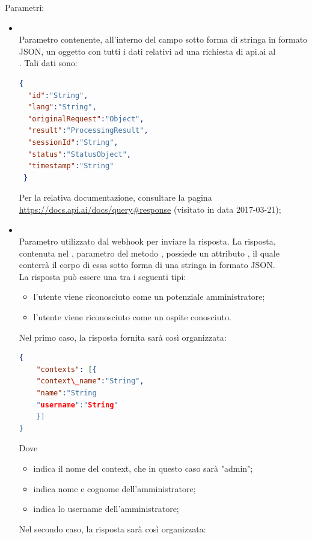 \begin{itemize}
\begin{itemize}
		Parametri:
		\begin{itemize}
			\item {} \\
			Parametro contenente, all'interno del campo  sotto forma di stringa in formato JSON, un oggetto con tutti i dati relativi ad una richiesta di api.ai al \\ . Tali dati sono:
\begin{lstlisting}[language=json,firstnumber=1]
{
  "id":"String",
  "lang":"String",
  "originalRequest":"Object",
  "result":"ProcessingResult",
  "sessionId":"String",
  "status":"StatusObject",
  "timestamp":"String"
 }
\end{lstlisting}
Per la relativa documentazione, consultare la pagina \url{https://docs.api.ai/docs/query#response} (visitato in data 2017-03-21);
			\item {} \\
			Parametro utilizzato dal webhook per inviare la risposta. La risposta, contenuta nel , parametro del metodo , possiede un attributo , il quale conterrà il corpo di essa sotto forma di una stringa in formato JSON. \\
La risposta può essere una tra i seguenti tipi:
\begin{itemize}
    \item l'utente viene riconosciuto come un potenziale amministratore;
    \item l'utente viene riconosciuto come un ospite conosciuto.
\end{itemize}
Nel primo caso, la risposta fornita sarà così organizzata:
\begin{lstlisting}[language=json,firstnumber=1]
{
    "contexts": [{
    "context\_name":"String",
    "name":"String
    "username":"String"
    }]
}
\end{lstlisting}
Dove
\begin{itemize}
    \item {} indica il nome del context, che in questo caso sarà "admin";
    \item {} indica nome e cognome dell'amministratore;
    \item {} indica lo username dell'amministratore;
\end{itemize}
Nel secondo caso, la risposta sarà così organizzata:
\begin{lstlisting}[language=json,firstnumber=1]

\end{lstlisting}
\end{itemize}
\end{itemize}
\end{itemize}
